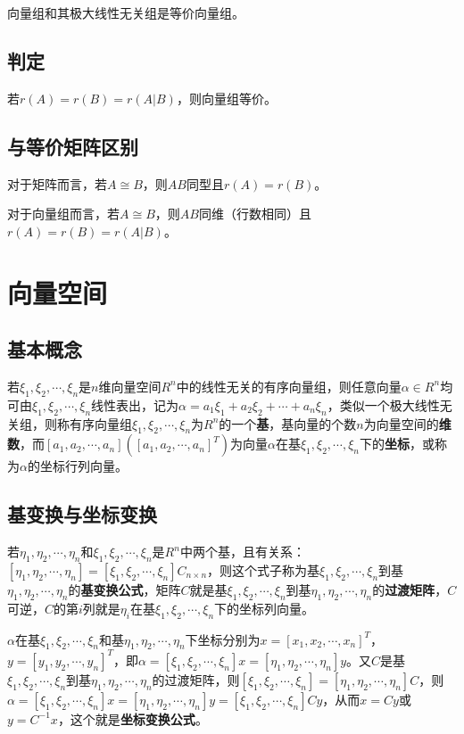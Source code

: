 \documentclass[UTF8, 12pt]{ctexart}
\begin{document}
向量组和其极大线性无关组是等价向量组。

\subsection{判定}

若$r(A)=r(B)=r(A|B)$，则向量组等价。

\subsection{与等价矩阵区别}

对于矩阵而言，若$A\cong B$，则$AB$同型且$r(A)=r(B)$。

对于向量组而言，若$A\cong B$，则$AB$同维（行数相同）且$r(A)=r(B)=r(A|B)$。

\section{向量空间}

\subsection{基本概念}

若$\xi_1,\xi_2,\cdots,\xi_n$是$n$维向量空间$R^n$中的线性无关的有序向量组，则任意向量$\alpha\in R^n$均可由$\xi_1,\xi_2,\cdots,\xi_n$线性表出，记为$\alpha=a_1\xi_1+a_2\xi_2+\cdots+a_n\xi_n$，类似一个极大线性无关组，则称有序向量组$\xi_1,\xi_2,\cdots,\xi_n$为$R^n$的一个\textbf{基}，基向量的个数$n$为向量空间的\textbf{维数}，而$[a_1,a_2,\cdots,a_n]([a_1,a_2,\cdots,a_n]^T)$为向量$\alpha$在基$\xi_1,\xi_2,\cdots,\xi_n$下的\textbf{坐标}，或称为$\alpha$的坐标行列向量。

\subsection{基变换与坐标变换}

若$\eta_1,\eta_2,\cdots,\eta_n$和$\xi_1,\xi_2,\cdots,\xi_n$是$R^n$中两个基，且有关系：$[\eta_1,\eta_2,\cdots,\eta_n]=[\xi_1,\xi_2,\cdots,\xi_n]C_{n\times n}$，则这个式子称为基$\xi_1,\xi_2,\cdots,\xi_n$到基$\eta_1,\eta_2,\cdots,\eta_n$的\textbf{基变换公式}，矩阵$C$就是基$\xi_1,\xi_2,\cdots,\xi_n$到基$\eta_1,\eta_2,\cdots,\eta_n$的\textbf{过渡矩阵}，$C$可逆，$C$的第$i$列就是$\eta_i$在基$\xi_1,\xi_2,\cdots,\xi_n$下的坐标列向量。

$\alpha$在基$\xi_1,\xi_2,\cdots,\xi_n$和基$\eta_1,\eta_2,\cdots,\eta_n$下坐标分别为$x=[x_1,x_2,\cdots,x_n]^T$，$y=[y_1,y_2,\cdots,y_n]^T$，即$\alpha=[\xi_1,\xi_2,\cdots,\xi_n]x=[\eta_1,\eta_2,\cdots,\eta_n]y$。又$C$是基$\xi_1,\xi_2,\cdots,\xi_n$到基$\eta_1,\eta_2,\cdots,\eta_n$的过渡矩阵，则$[\xi_1,\xi_2,\cdots,\xi_n]=[\eta_1,\eta_2,\cdots,\eta_n]C$，则$\alpha=[\xi_1,\xi_2,\cdots,\xi_n]x=[\eta_1,\eta_2,\cdots,\eta_n]y=[\xi_1,\xi_2,\cdots,\xi_n]Cy$，从而$x=Cy$或$y=C^{-1}x$，这个就是\textbf{坐标变换公式}。
\end{document}
